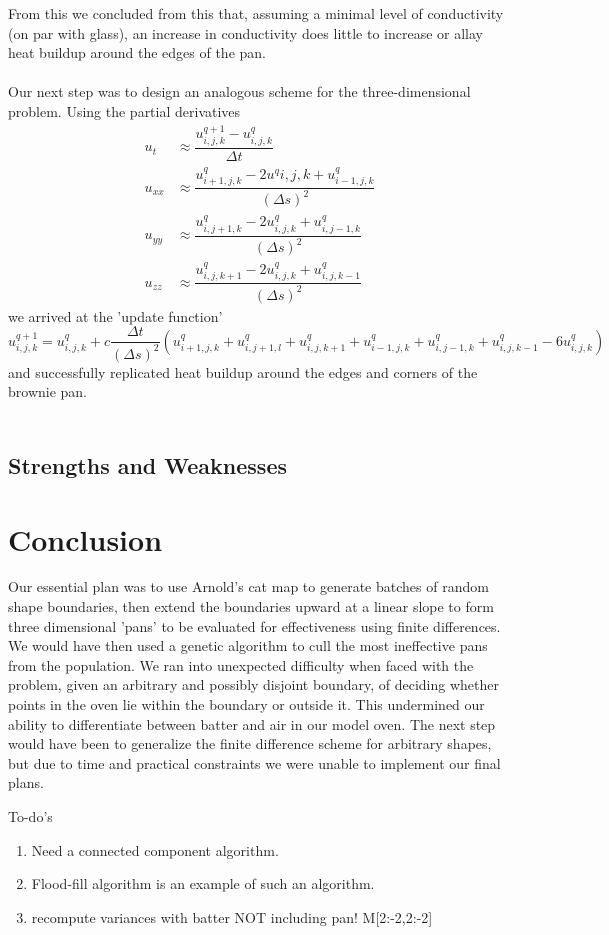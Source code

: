 \documentclass[12pt]{reedmcm}
\begin{document}
From this we concluded from this that, assuming a minimal level of conductivity (on par with glass), an increase in conductivity does little to increase or allay heat buildup around the edges of the pan.\\
\\
Our next step was to design an analogous scheme for the three-dimensional problem.  Using the partial derivatives
\begin{align*}
u_t &\approx \dfrac{u_{i,j,k}^{q+1} - u_{i,j,k}^q}{\Delta t}\\
u_{xx} &\approx \dfrac{u_{i+1,j,k}^q - 2u^q{i,j,k} + u_{i-1,j,k}^q}{(\Delta s)^2}\\
u_{yy} &\approx \dfrac{u_{i,j+1,k}^q - 2u_{i,j,k}^q + u_{i,j-1,k}^q}{(\Delta s)^2}\\
u_{zz} &\approx \dfrac{u_{i,j,k+1}^q - 2u_{i,j,k}^q + u_{i,j,k-1}^q}{(\Delta s)^2} \end{align*} 
we arrived at the 'update function'
\[u^{q+1}_{i,j,k} = u^q_{i,j,k} + c \frac{\Delta t}{(\Delta s)^2} \left(u^q_{i+1,j,k} + u^q_{i,j+1,l} + u^q_{i,j,k+1} + u^q_{i-1,j,k} + u^q_{i,j-1,k} + u^q_{i,j,k-1} - 6u^q_{i,j,k} \right)\]
and successfully replicated heat buildup around the edges and corners of the brownie pan.\\
\\



\subsection{Strengths and Weaknesses}

\section{Conclusion}
Our essential plan was to use Arnold's cat map to generate batches of random shape boundaries, then extend the boundaries upward at a linear slope to form three dimensional 'pans' to be evaluated for effectiveness using finite differences.  We would have then used a genetic algorithm to cull the most ineffective pans from the population.  We ran into unexpected difficulty when faced with the problem, given an arbitrary and possibly disjoint boundary, of deciding whether points in the oven lie within the boundary or outside it.  This undermined our ability to differentiate between batter and air in our model oven.  The next step would have been to generalize the finite difference scheme for arbitrary shapes, but due to time and practical constraints we were unable to implement our final plans. 

To-do's
\begin{enumerate}
  \item Need a connected component algorithm.
  \item Flood-fill algorithm is an example of such an algorithm.
  \item recompute variances with batter NOT including pan! M[2:-2,2:-2]
\end{enumerate}

\renewcommand{\bibname}{References}

\nocite{*}

\end{document}

